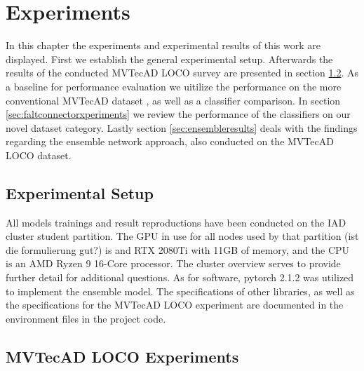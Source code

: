 \chapter{Experiments}
\label{chap:experiments}

In this chapter the experiments and experimental results of this work are displayed. First we establish the general experimental setup. Afterwards the results of the conducted MVTecAD LOCO \cite{LOCODentsAndScratchesBergmann2022}
survey are presented in section \ref{sec:locoxperiments}. As a baseline for performance evaluation we uitilize the performance on the more conventional MVTecAD dataset \cite{MVTEC_Bergmann_2021}, 
as well as a classifier comparison. In section \ref{sec:faltconnectorxperiments} we review the performance of the classifiers on our novel dataset category. Lastly section \ref{sec:ensembleresults} 
deals with the findings regarding the ensemble network approach, also conducted on the MVTecAD LOCO dataset.


\section{Experimental Setup}
\label{sec:experimentsetup}

All models trainings and result reproductions have been conducted on the IAD cluster student partition. The GPU in use for all nodes used by that partition (ist die formulierung gut?) is and 
RTX 2080Ti with 11GB of memory, and the CPU is an AMD Ryzen 9 16-Core processor. The cluster overview \cite{clusterdocs} serves to provide further detail for additional questions. As for software, 
pytorch 2.1.2 was utilized to implement the ensemble model. The specifications of other libraries, as well as the specifications for the MVTecAD LOCO experiment are documented in the 
environment files in the project code.



\section{MVTecAD LOCO Experiments}
\label{sec:locoxperiments}

